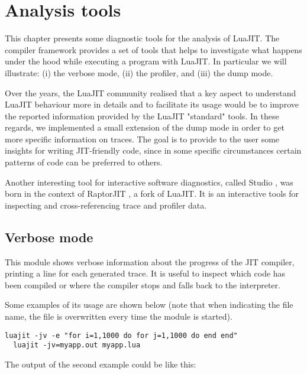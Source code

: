 \chapter{Analysis tools}
\label{Chapt:appendix-tools}

This chapter presents some diagnostic tools for the analysis of LuaJIT. The compiler framework provides a set of tools that helps to investigate what happens under the hood while executing a program with LuaJIT. In particular we will illustrate: (i) the verbose mode, (ii) the profiler, and (iii) the dump mode.

Over the years, the LuaJIT community realised that a key aspect to understand LuaJIT behaviour more in details and to facilitate its usage would be to improve the reported information provided by the LuaJIT "standard" tools. In these regards, we implemented a small extension of the dump mode in order to get more specific information on traces. The goal is to provide to the user some insights for writing JIT-friendly code, since in some specific circumstances certain patterns of code can be preferred to others.

Another interesting tool for interactive software diagnostics, called Studio \cite{gorrie2017studio}, was born in the context of RaptorJIT \cite{gorrie2017raptorjit}, a fork of LuaJIT. It is an interactive tools for inspecting and cross-referencing trace and profiler data.



\section{Verbose mode}
\label{Sec:Verbose}

This module shows verbose information about the progress of the JIT compiler, printing a line for each generated trace. It is useful to inspect which code has been compiled or where the compiler stops and falls back to the interpreter.

Some examples of its usage are shown below (note that when indicating the file name, the file is overwritten every time the module is started).

\begin{lstlisting}[style=CommandsLuaJIT]
  luajit -jv -e "for i=1,1000 do for j=1,1000 do end end"
  luajit -jv=myapp.out myapp.lua
\end{lstlisting}

\noindent
The output of the second example could be like this:


